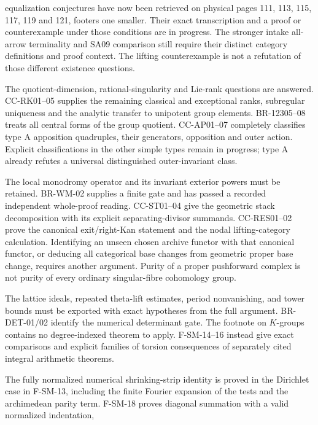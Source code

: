 \begin{description}[style=nextline,leftmargin=0pt]
equalization conjectures have now been retrieved on physical pages
111, 113, 115, 117, 119 and 121, footers one smaller. Their exact
transcription and a proof or counterexample under those conditions
are in progress. The stronger intake all-arrow terminality and SA09
comparison still require their distinct category definitions and proof
context. The lifting counterexample is not a refutation of those
different existence questions.
\item[Cote 123: apposition outside type A.]
The quotient-dimension, rational-singularity and Lie-rank questions
are answered. CC-RK01--05 supplies the remaining classical and
exceptional ranks, subregular uniqueness and the analytic transfer
to unipotent group elements. BR-12305--08 treats all central forms
of the group quotient. CC-AP01--07 completely classifies type A
apposition quadruples, their generators, opposition and outer action.
Explicit classifications in the other simple types remain in progress;
type A already refutes a universal distinguished outer-invariant class.
\item[Weight--monodromy and universal-curve categories.]
The local monodromy operator and its invariant exterior powers must
be retained. BR-WM-02 supplies a finite gate and has passed a
recorded independent whole-proof reading. CC-ST01--04 give the geometric
stack decomposition with its explicit separating-divisor summands.
CC-RES01--02 prove the canonical exit/right-Kan statement and the nodal
lifting-category calculation. Identifying an unseen chosen archive
functor with that canonical functor, or deducing all categorical base
changes from geometric proper base change, requires another argument.
Purity of a proper pushforward
complex is not purity of every ordinary singular-fibre cohomology group.
\item[The analytic method as a transferable theorem.]
The lattice ideals, repeated theta-lift estimates, period nonvanishing,
and tower bounds must be exported with exact hypotheses from the
full argument. BR-DET-01/02 identify the numerical determinant gate.
The footnote on $K$-groups contains no degree-indexed theorem to apply.
F-SM-14--16 instead give exact comparisons and explicit families of
torsion consequences of separately cited integral arithmetic theorems.
\item[Masullo's operator realization.]
The fully normalized numerical shrinking-strip identity is proved in
the Dirichlet case in F-SM-13, including the finite Fourier expansion
of the tests and the archimedean parity term. F-SM-18 proves diagonal summation with a valid normalized indentation,

\end{description}
